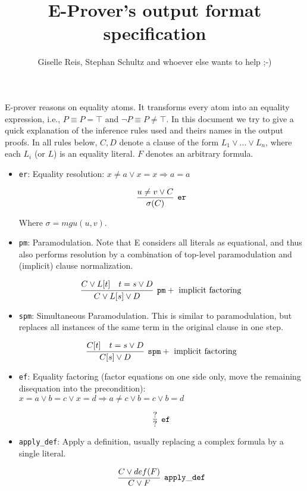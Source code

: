 \documentclass[a4paper, 11pt]{article}
\title{E-Prover's output format specification}
\author{Giselle Reis, Stephan Schultz and whoever
else wants to help ;-)}
\begin{document}
\maketitle

E-prover reasons on equality atoms. It transforms every atom into an equality
expression, i.e., $P \equiv P = \top$ and $\neg P \equiv P \neq \top$.
%
In this document we try to give a quick explanation of the inference rules used
and theirs names in the output proofs. In all rules below, $C, D$ denote a
clause of the form $L_1 \vee ... \vee L_n$, where each $L_i$ (or $L$) is an
equality literal. $F$ denotes an arbitrary formula.

\begin{itemize}
\item \texttt{er}: 
  Equality resolution: $x \neq a \vee x = x \Rightarrow a = a$

  \[
  \infer[\mathtt{er}]{\sigma(C)}{u \neq v \vee C}
  \]

  Where $\sigma = mgu(u,v)$.

\item \texttt{pm}: 
  Paramodulation. Note that E considers all literals as
  equational, and thus also performs resolution by a combination of top-level
  paramodulation and (implicit) clause normalization.

  \[
  \infer[\mathtt{pm} + \mbox{ implicit factoring}]{C \vee L[s] \vee D}{
    C \vee L[t] &
    t = s \vee D
  }
  \]

\item \texttt{spm}: 
  Simultaneous Paramodulation. This is similar to
  paramodulation, but replaces all instances of the same term in the original
  clause in one step.

  \[
  \infer[\mathtt{spm} + \mbox{ implicit factoring}]{C[s] \vee D}{
    C[t] &
    t = s \vee D
  }
  \]

\item \texttt{ef}: 
  Equality factoring (factor equations on one side only, move
  the remaining disequation into the precondition): 
  \newline
  $x = a \vee b = c \vee x = d \Rightarrow a \neq c \vee b = c \vee b = d$

  \[
  \infer[\mathtt{ef}]{?}{?}
  \]

\item \texttt{apply\_def}: 
  Apply a definition, usually replacing a complex
  formula by a single literal.

  \[
  \infer[\mathtt{apply\_def}]{C \vee F}{
    C \vee def(F)
  }
  \]


\end{itemize}
\end{document}
